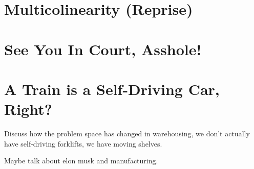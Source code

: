 \section{Multicolinearity (Reprise)}


\section{See You In Court, Asshole!}

\section{A Train is a Self-Driving Car, Right?}

Discuss how the problem space has changed in warehousing, we don't actually have self-driving forklifts, we have moving shelves.

Maybe talk about elon musk and manufacturing.
